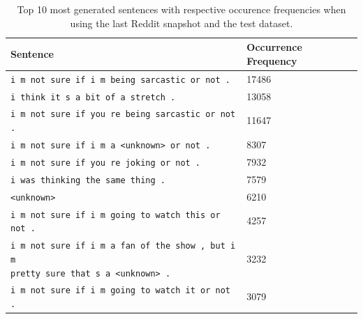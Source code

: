 \begin{table}[H]
	\centering
	\begin{adjustbox}{max width=\textwidth}
		\begin{tabular}{ll}
			\toprule
			Sentence & Occurrence Frequency\\ \midrule
			\texttt{i m not sure if i m being sarcastic or not .} & 17486\\
			\texttt{i think it s a bit of a stretch .} & 13058\\
			\texttt{i m not sure if you re being sarcastic or not .} & 11647\\
			\texttt{i m not sure if i m a <unknown> or not .} & 8307\\
			\texttt{i m not sure if you re joking or not .} & 7932\\
			\texttt{i was thinking the same thing .} & 7579\\
			\texttt{<unknown>} & 6210\\
			\texttt{i m not sure if i m going to watch this or not .} & 4257\\
			\specialcell{\texttt{i m not sure if i m a fan of the show , but i m}\\\texttt{pretty sure that s a <unknown> .}} & 3232\\
			\texttt{i m not sure if i m going to watch it or not .} & 3079\\
			\bottomrule
		\end{tabular}
	\end{adjustbox}
	\caption{Top 10 most generated sentences with respective occurence frequencies when using the last Reddit snapshot and the test dataset.}
	\label{results:test_performance:reddit_sample_outputs}
\end{table}

